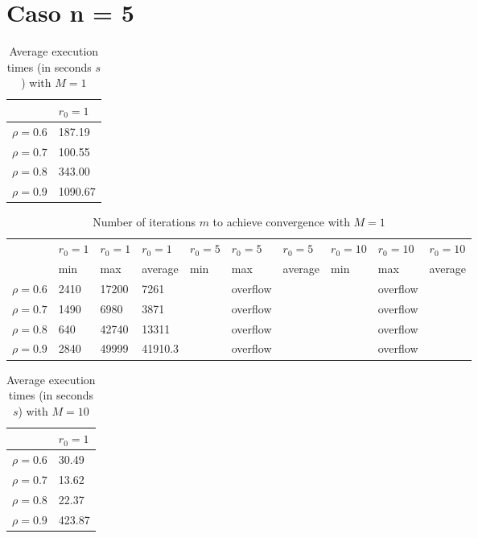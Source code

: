 \documentclass[a4paper,11pt,openright]{report}
\begin{document}
\section*{Caso n = 5} 
\begin{table}[H]
\centering
\addtolength{\leftskip}{-1.5cm}
\addtolength{\rightskip}{-1.5cm}
\begin{tabular}{|c|l|}
\hline
$ $ & $r_0 = 1$ \\
\hline
$\rho = 0.6$ & 187.19 \\

$\rho = 0.7$ & 100.55 \\

$\rho = 0.8$ & 343.00 \\

$\rho = 0.9$ & 1090.67 \\
\hline
\end{tabular}
\caption{Average execution
 times (in seconds $s$) with $M = 1$}
\end{table}
\begin{table}[H]
\centering
\addtolength{\leftskip}{-1.5cm}
\addtolength{\rightskip}{-1.5cm}
\begin{tabular}{|c|lllllllll|}
\hline
$ $ & $r_0 = 1$ & $r_0 = 1$ & $r_0 = 1$ & $r_0 = 5$ & $r_0 = 5$ & $r_0 = 5$ & $r_0 = 10$ & $r_0 = 10$ & $r_0 = 10$  \\
$ $ & min & max & average & min & max & average & min & max & average \\ 
\hline
$\rho = 0.6$ & 2410 & 17200 & 7261 &  & overflow &  &  & overflow &  \\

$\rho = 0.7$ & 1490 & 6980 & 3871 &  & overflow &  &  & overflow &  \\

$\rho = 0.8$ & 640 & 42740 & 13311 &  & overflow &  &  & overflow & \\

$\rho = 0.9$ & 2840 & 49999 & 41910.3 &  & overflow &  &  & overflow & \\
\hline
\end{tabular}
\caption{Number of iterations $m$ to achieve convergence with $M = 1$}
\end{table}
\begin{table}[H]
\centering
\addtolength{\leftskip}{-1.5cm}
\addtolength{\rightskip}{-1.5cm}
\begin{tabular}{|c|l|}
\hline
$ $ & $r_0 = 1$  \\
\hline
$\rho = 0.6$ & 30.49  \\

$\rho = 0.7$ & 13.62  \\

$\rho = 0.8$ & 22.37  \\

$\rho = 0.9$ & 423.87   \\
\hline
\end{tabular}
\caption{Average execution
 times (in seconds $s$) with $M = 10$}
\end{table}
\end{document}
